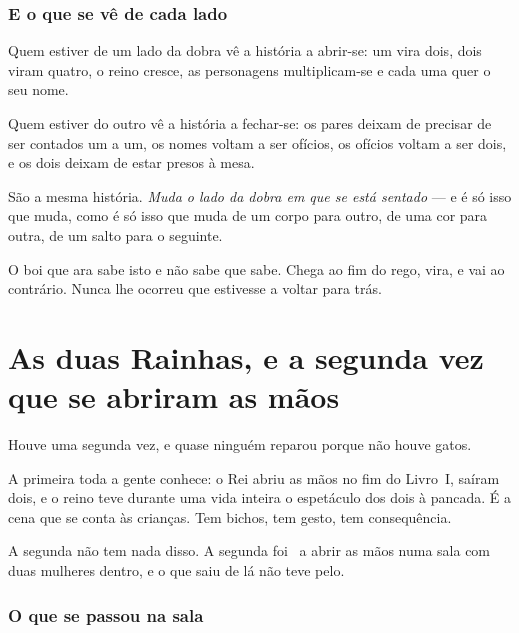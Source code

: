 \documentclass[livro.tex]{subfiles}
\begin{document}
\subsection*{E o que se vê de cada lado}

Quem estiver de um lado da dobra vê a história a abrir-se: um vira dois, dois viram quatro, o
reino cresce, as personagens multiplicam-se e cada uma quer o seu nome.

\medskip

Quem estiver do outro vê a história a fechar-se: os pares deixam de precisar de ser contados um a
um, os nomes voltam a ser ofícios, os ofícios voltam a ser dois, e os dois deixam de estar presos
à mesa.

\medskip

São a mesma história. \emph{Muda o lado da dobra em que se está sentado} --- e é só isso que muda,
como é só isso que muda de um corpo para outro, de uma cor para outra, de um salto para o
seguinte.

\medskip

O boi que ara sabe isto e não sabe que sabe. Chega ao fim do rego, vira, e vai ao contrário. Nunca
lhe ocorreu que estivesse a voltar para trás.


\chapter{As duas Rainhas, e a segunda vez que se abriram as mãos}

Houve uma segunda vez, e quase ninguém reparou porque não houve gatos.

\medskip

A primeira toda a gente conhece: o Rei abriu as mãos no fim do Livro~I, saíram dois, e o reino
teve durante uma vida inteira o espetáculo dos dois à pancada. É a cena que se conta às crianças.
Tem bichos, tem gesto, tem consequência.

\medskip

A segunda não tem nada disso. A segunda foi \Joa\ a abrir as mãos numa sala com duas mulheres
dentro, e o que saiu de lá não teve pelo.

\subsection*{O que se passou na sala}
\end{document}
